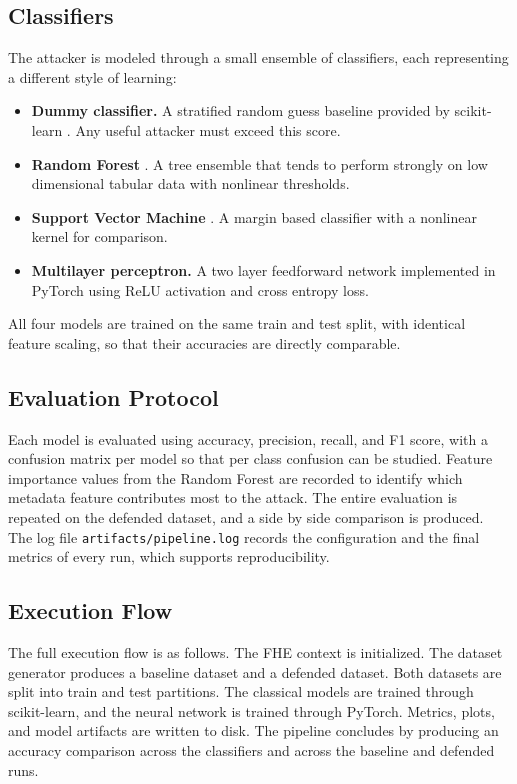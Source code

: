 \documentclass[12pt,a4paper]{article}
\begin{document}
\subsection{Classifiers}
The attacker is modeled through a small ensemble of classifiers, each representing a different style of learning:
\begin{itemize}[leftmargin=*]
  \item \textbf{Dummy classifier.} A stratified random guess baseline provided by scikit-learn \cite{pedregosa2011scikit}. Any useful attacker must exceed this score.
  \item \textbf{Random Forest} \cite{breiman2001random}. A tree ensemble that tends to perform strongly on low dimensional tabular data with nonlinear thresholds.
  \item \textbf{Support Vector Machine} \cite{cortes1995support}. A margin based classifier with a nonlinear kernel for comparison.
  \item \textbf{Multilayer perceptron.} A two layer feedforward network implemented in PyTorch \cite{paszke2019pytorch} using ReLU activation and cross entropy loss.
\end{itemize}
All four models are trained on the same train and test split, with identical feature scaling, so that their accuracies are directly comparable.

\subsection{Evaluation Protocol}
Each model is evaluated using accuracy, precision, recall, and F1 score, with a confusion matrix per model so that per class confusion can be studied. Feature importance values from the Random Forest are recorded to identify which metadata feature contributes most to the attack. The entire evaluation is repeated on the defended dataset, and a side by side comparison is produced. The log file \texttt{artifacts/pipeline.log} records the configuration and the final metrics of every run, which supports reproducibility.

\subsection{Execution Flow}
The full execution flow is as follows. The FHE context is initialized. The dataset generator produces a baseline dataset and a defended dataset. Both datasets are split into train and test partitions. The classical models are trained through scikit-learn, and the neural network is trained through PyTorch. Metrics, plots, and model artifacts are written to disk. The pipeline concludes by producing an accuracy comparison across the classifiers and across the baseline and defended runs.
\end{document}
